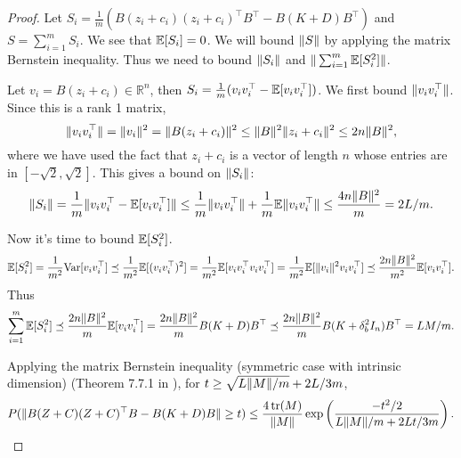 \begin{proof}
  Let $S_i = \frac{1}{m} \left( B (z_i + c_i) (z_i + c_i)^\top B^\top - B (K + D)B^\top
  \right)$ and $S = \sum_{i=1}^{m} S_i$.
  We see that $\mathbb{E}[S_i] = 0$.
  We will bound $\|S\|$ by applying the matrix Bernstein inequality.
  Thus we need to bound $\|S_i\|$ and $\|\sum_{i=1}^{m} \mathbb{E}[S_i^2]\|$.

  Let $v_i = B(z_i + c_i) \in \mathbb{R}^{n}$, then $S_i = \frac{1}{m} (v_i
  v_i^\top  - \mathbb{E}[v_i v_i^\top])$.
  We first bound $\|v_i v_i^\top\|$.
  Since this is a rank 1 matrix,
  \begin{equation*}
    \|v_i v_i^\top\| = \|v_i\|^2 = \|B(z_i + c_i)\|^2 \leq \|B\|^2
    \|z_i + c_i\|^2 \leq 2n \|B\|^2,
  \end{equation*}
  where we have used the fact that $z_i + c_i$ is a vector of length $n$ whose
  entries are in $[-\sqrt{2}, \sqrt{2}]$.
  This gives a bound on $\|S_i\|$:
  \begin{equation*}
    \|S_i\| = \frac{1}{m} \|v_i v_i^\top - \mathbb{E}[v_i v_i^\top]\|
    \leq \frac{1}{m} \|v_i v_i^\top\| + \frac{1}{m} \mathbb{E} \|v_i v_i^\top\|
    \leq \frac{4n \|B\|^2}{m} = 2L/m.
  \end{equation*}

  Now it's time to bound $\mathbb{E}[S_i^2]$.
  \begin{equation*}
    \mathbb{E}[S_i^2] = \frac{1}{m^2} {\rm Var}[v_i v_i^\top] \preceq \frac{1}{m^2} \mathbb{E}[(v_i v_i^\top)^2]
    = \frac{1}{m^2} \mathbb{E}[v_i v_i^\top v_i v_i^\top] = \frac{1}{m^2} \mathbb{E}[\|v_i\|^2 v_i
    v_i^\top] \preceq \frac{2n \|B\|^2}{m^2} \mathbb{E}[v_i v_i^\top].
  \end{equation*}
  Thus
  \begin{equation*}
    \sum_{i=1}^{m} \mathbb{E}[S_i^2] \preceq \frac{2n \|B\|^2}{m} \mathbb{E}[v_i v_i^\top] = \frac{2n
      \|B\|^2}{m} B(K + D) B^\top \preceq \frac{2n \|B\|^2}{m} B(K + \delta^2_b I_n)B^\top
    = LM/m.
  \end{equation*}

  Applying the matrix Bernstein inequality (symmetric case with intrinsic
  dimension) (Theorem 7.7.1 in \cite{tropp2015introduction}),
  for $t \geq \sqrt{L \|M\|/m} + 2L/3m$,
  \begin{equation*}
    P(\|B(Z + C)(Z + C)^\top B - B(K + D)B\| \geq t) \leq \frac{4\mathop{\rm tr}(M)}{\|M\|}
    \exp \left( \frac{-t^2/2}{L \|M\|/m + 2Lt/3m} \right).
  \end{equation*}
\end{proof}

